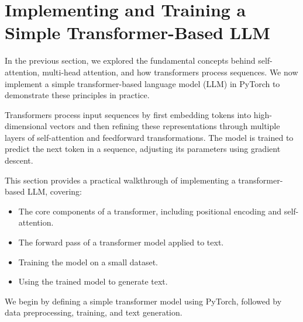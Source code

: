 %
\section{Implementing and Training a Simple Transformer-Based LLM}

In the previous section, we explored the fundamental concepts behind self-attention, multi-head attention, and how transformers process sequences. We now implement a simple transformer-based language model (LLM) in PyTorch to demonstrate these principles in practice.

Transformers process input sequences by first embedding tokens into high-dimensional vectors and then refining these representations through multiple layers of self-attention and feedforward transformations. The model is trained to predict the next token in a sequence, adjusting its parameters using gradient descent.

This section provides a practical walkthrough of implementing a transformer-based LLM, covering:
\begin{itemize}
    \item The core components of a transformer, including positional encoding and self-attention.
    \item The forward pass of a transformer model applied to text.
    \item Training the model on a small dataset.
    \item Using the trained model to generate text.
\end{itemize}

We begin by defining a simple transformer model using PyTorch, followed by data preprocessing, training, and text generation.


